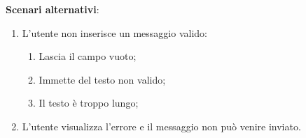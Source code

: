 \textbf{Scenari alternativi}:
\begin{enumerate}
    \item L'utente non inserisce un messaggio valido:
    \begin{enumerate}
        \item Lascia il campo vuoto;
        \item Immette del testo non valido;
        \item Il testo è troppo lungo;
    \end{enumerate}
    \item L'utente visualizza l'errore e il messaggio non può venire inviato.
\end{enumerate}
\newpage